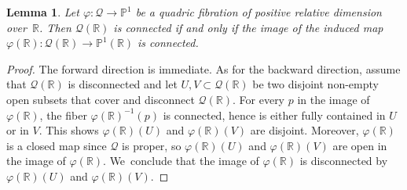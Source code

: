 \documentclass[JEP,XML,SOM,Unicode,NoEqCountersInSection,published]{cedram}
\let\cal\mathcal
\theoremstyle{plain}
\newtheorem{lem}[thm]{Lemma}
\theoremstyle{definition}
\let\phi\varphi
\renewcommand\P{\mathbb{P}}
\newcommand\R{\mathbb{R}}
\begin{document}
\begin{lem}\label{lem:Q-reallocus-connected}
Let $\phi\colon \mathcal{Q}\to \P^1$ be a quadric fibration of positive relative dimension over~$\R$.
Then $\mathcal{Q}(\R)$ is connected if and only if the image of the induced map $\phi(\R)\colon \mathcal{Q}(\R)\to \P^1(\R)$ is connected.
\end{lem}

\begin{proof}
The forward direction is immediate.
As for the backward direction, assume that $\mathcal{Q}(\R)$ is disconnected and let $U, V\subset \mathcal{Q}(\R)$ be two disjoint non-empty open subsets that cover and disconnect $\mathcal{Q}(\R)$.
For every $p$ in the image of $\phi(\R)$, the fiber $\phi(\R)^{-1}(p)$ is connected, hence
is either fully contained in \(U\) or in \(V\).
This shows $\phi(\R)(U)$ and $\phi(\R)(V)$ are disjoint.
Moreover, $\phi(\R)$ is a closed map since \(\cal Q\) is proper, so
$\phi(\R)(U)$ and $\phi(\R)(V)$ are open in the image of $\phi(\R)$. We~conclude that the image of $\phi(\R)$ is disconnected by $\phi(\R)(U)$ and $\phi(\R)(V)$.
\end{proof}
\end{document}
